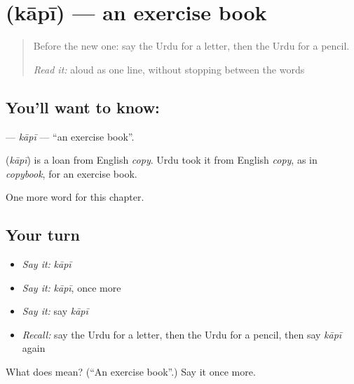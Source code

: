 \section[\texorpdfstring{\ur{کاپی} (kāpī)}{کاپی (kāpī)}]{ (kāpī) — an exercise book}

\label{lesson:UR-C113-kapi}



\begin{quote}
Before the new one: say the Urdu for a letter, then the Urdu for a pencil.

\emph{Read it:} \textbf{  } aloud as one line, without stopping between the words
\end{quote}

\subsection*{You'll want to know: }
\textbf{} — \emph{kāpī} — \textquotedblleft{}an exercise book\textquotedblright{}.

\begin{cousinweb}
\textbf{} (\emph{kāpī}) is a loan from English \emph{copy}. Urdu took it from English \emph{copy}, as in \emph{copybook}, for an exercise book.
\end{cousinweb}

\begin{grammarlens}[title={What you've built}]
One more word for this chapter.
\end{grammarlens}

\subsection*{Your turn}
\begin{itemize}
\raggedright
  \item \emph{Say it:} \emph{kāpī}
  \item \emph{Say it:} \emph{kāpī}, once more
  \item \emph{Say it:} say \emph{kāpī}
  \item \emph{Recall:} say the Urdu for a letter, then the Urdu for a pencil, then say \emph{kāpī} again
\end{itemize}

\begin{tcolorbox}[breakable,colback=teal!4,colframe=teal!35!black,title={Before you move on}]
What does  mean? (\textquotedblleft{}An exercise book\textquotedblright{}.) Say it once more.
\end{tcolorbox}
